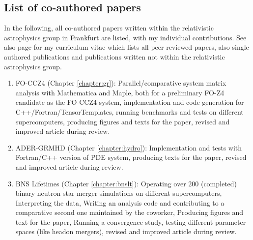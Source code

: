 \begin{fullwidth}
\section{List of co-authored papers}
In the following, all co-authored papers written within the relativistic
astrophysics group in Frankfurt are listed, with my individual contributions.
See also page \pageref{sec:cv} for my curriculum vitae which lists all
peer reviewed papers, \ie also single authored publications and publications
written not within the relativistic astrophysics group.

\begin{enumerate}
	\item[\cite{Dumbser2017}] FO-CCZ4 (Chapter \ref{chapter:gr}):
	   Parallel/comparative system matrix analysis with Mathematica and Maple,
	   both for a preliminary FO-Z4 candidate as the FO-CCZ4 system,
	   implementation and code generation for C++/\-Fortran/\-TensorTemplates,
	   running benchmarks and tests on different supercomputers,
       producing figures and texts for the paper,
	   revised and improved article during review.
	\item[\cite{Fambri2017}] ADER-GRMHD (Chapter \ref{chapter:hydro}):
	   Implementation and tests with Fortran/C++ version of PDE system,
	   producing texts for the paper,
	   revised and improved article during review.
	\item[\cite{Koeppel2019}] BNS Lifetimes (Chapter \ref{chapter:bnslt}):
		Operating over 200 (completed) binary neutron star merger simulations
		on different supercomputers,
		Interpreting the data,
		Writing an analysis code and contributing to a 
		comparative second one maintained by the coworker,
		Producing figures and text for the paper,
		Running a convergence study, testing different parameter spaces
		(like headon mergers),
		revised and improved article during review.
\end{enumerate}


\end{fullwidth}
